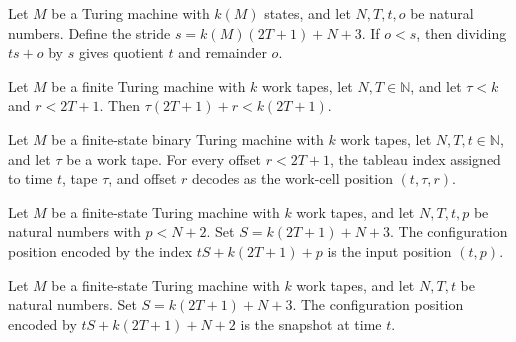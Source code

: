\begin{theorem}
\label{Complexity.div_mod_stride}
\leanok
{}
Let $M$ be a Turing machine with $k(M)$ states, and let $N,T,t,o$ be natural numbers.
Define the stride $s=k(M)(2T+1)+N+3$. If $o<s$, then dividing $ts+o$ by $s$ gives
quotient $t$ and remainder $o$.
\end{theorem}

\begin{theorem}
\label{Complexity.cell_off_lt}
\leanok
{}
Let $M$ be a finite Turing machine with $k$ work tapes, let $N,T\in\mathbb{N}$, and let
$\tau<k$ and $r<2T+1$. Then $\tau(2T+1)+r<k(2T+1)$.
\end{theorem}

\begin{theorem}
\label{Complexity.cfgPos_cellIdx}
\leanok
{}
Let $M$ be a finite-state binary Turing machine with $k$ work tapes, let
$N,T,t\in\mathbb N$, and let $\tau$ be a work tape. For every offset $r<2T+1$, the
tableau index assigned to time $t$, tape $\tau$, and offset $r$ decodes as the work-cell
position $(t,\tau,r)$.
\end{theorem}

\begin{theorem}
\label{Complexity.cfgPos_inpIdx}
\leanok
{}
Let $M$ be a finite-state Turing machine with $k$ work tapes, and let $N,T,t,p$ be
natural numbers with $p<N+2$. Set $S=k(2T+1)+N+3$. The configuration position encoded by
the index $tS+k(2T+1)+p$ is the input position $(t,p)$.
\end{theorem}

\begin{theorem}
\label{Complexity.cfgPos_snapIdx}
\leanok
{}
Let $M$ be a finite-state Turing machine with $k$ work tapes, and let $N,T,t$ be natural
numbers. Set $S=k(2T+1)+N+3$. The configuration position encoded by $tS+k(2T+1)+N+2$ is
the snapshot at time $t$.
\end{theorem}

